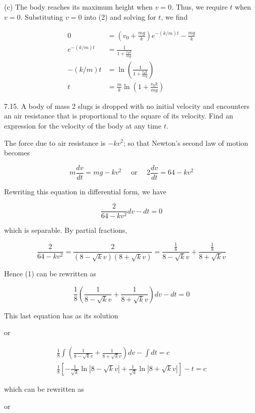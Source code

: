 \documentclass[10pt]{article}
\begin{document}
(c) The body reaches its maximum height when $v=0$. Thus, we require $t$ when $v=0$. Substituting $v=0$ into (2) and solving for $t$, we find

$$
\begin{aligned}
0 & =\left(v_{0}+\frac{m g}{k}\right) e^{-(k / m) t}-\frac{m g}{k} \\
e^{-(k / m) t} & =\frac{1}{1+\frac{v_{0} k}{m g}} \\
-(k / m) t & =\ln \left(\frac{1}{1+\frac{v_{0} k}{m g}}\right) \\
t & =\frac{m}{k} \ln \left(1+\frac{v_{0} k}{m g}\right)
\end{aligned}
$$

7.15. A body of mass 2 slugs is dropped with no initial velocity and encounters an air resistance that is proportional to the square of its velocity. Find an expression for the velocity of the body at any time $t$.

The force due to air resistance is $-k v^{2}$; so that Newton's second law of motion becomes

$$
m \frac{d v}{d t}=m g-k v^{2} \quad \text { or } \quad 2 \frac{d v}{d t}=64-k v^{2}
$$

Rewriting this equation in differential form, we have


\begin{equation*}
\frac{2}{64-k v^{2}} d v-d t=0 \tag{1}
\end{equation*}


which is separable. By partial fractions,

$$
\frac{2}{64-k v^{2}}=\frac{2}{(8-\sqrt{k} v)(8+\sqrt{k} v)}=\frac{\frac{1}{8}}{8-\sqrt{k} v}+\frac{\frac{1}{8}}{8+\sqrt{k} v}
$$

Hence (1) can be rewritten as

$$
\frac{1}{8}\left(\frac{1}{8-\sqrt{k} v}+\frac{1}{8+\sqrt{k} v}\right) d v-d t=0
$$

This last equation has as its solution

or

$$
\begin{gathered}
\frac{1}{8} \int\left(\frac{1}{8-\sqrt{k} v}+\frac{1}{8+\sqrt{k} v}\right) d v-\int d t=c \\
\frac{1}{8}\left[-\frac{1}{\sqrt{k}} \ln |8-\sqrt{k} v|+\frac{1}{\sqrt{k}} \ln |8+\sqrt{k} v|\right]-t=c
\end{gathered}
$$

which can be rewritten as

or
\end{document}
